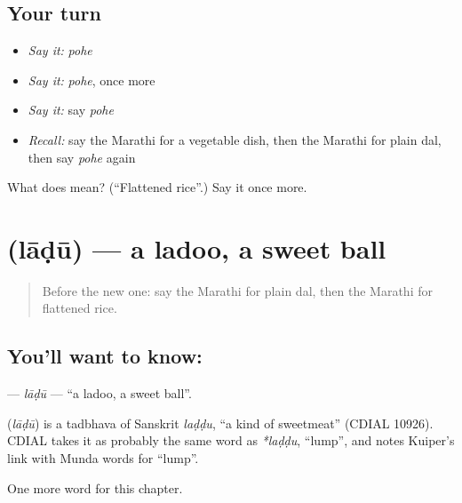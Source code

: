 \subsection*{Your turn}
\begin{itemize}
\raggedright
  \item \emph{Say it:} \emph{pohe}
  \item \emph{Say it:} \emph{pohe}, once more
  \item \emph{Say it:} say \emph{pohe}
  \item \emph{Recall:} say the Marathi for a vegetable dish, then the Marathi for plain dal, then say \emph{pohe} again
\end{itemize}

\begin{tcolorbox}[breakable,colback=teal!4,colframe=teal!35!black,title={Before you move on}]
What does  mean? (\textquotedblleft{}Flattened rice\textquotedblright{}.) Say it once more.
\end{tcolorbox}
\section[\texorpdfstring{\mr{लाडू} (lāḍū)}{लाडू (lāḍū)}]{ (lāḍū) — a ladoo, a sweet ball}

\label{lesson:MR-C137-ladu}



\begin{quote}
Before the new one: say the Marathi for plain dal, then the Marathi for flattened rice.
\end{quote}

\subsection*{You'll want to know: }
\textbf{} — \emph{lāḍū} — \textquotedblleft{}a ladoo, a sweet ball\textquotedblright{}.

\begin{cousinweb}
\textbf{} (\emph{lāḍū}) is a tadbhava of Sanskrit \emph{laḍḍu}, \textquotedblleft{}a kind of sweetmeat\textquotedblright{} (CDIAL 10926). CDIAL takes it as probably the same word as \emph{*laḍḍu}, \textquotedblleft{}lump\textquotedblright{}, and notes Kuiper's link with Munda words for \textquotedblleft{}lump\textquotedblright{}.
\end{cousinweb}

\begin{grammarlens}[title={What you've built}]
One more word for this chapter.
\end{grammarlens}

